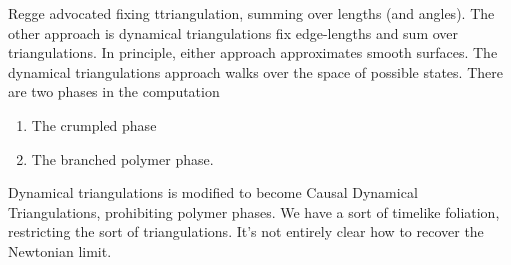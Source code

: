 Regge advocated fixing ttriangulation, summing over lengths (and
angles). The other approach is dynamical triangulations fix edge-lengths
and sum over triangulations. In principle, either approach approximates
smooth surfaces. The dynamical triangulations approach walks over the
space of possible states. There are two phases in the computation
\begin{enumerate}
\item The crumpled phase
\item The branched polymer phase.
\end{enumerate}
Dynamical triangulations is modified to become Causal Dynamical
Triangulations, prohibiting polymer phases. We have a sort of timelike
foliation, restricting the sort of triangulations. It's not entirely
clear how to recover the Newtonian limit.
